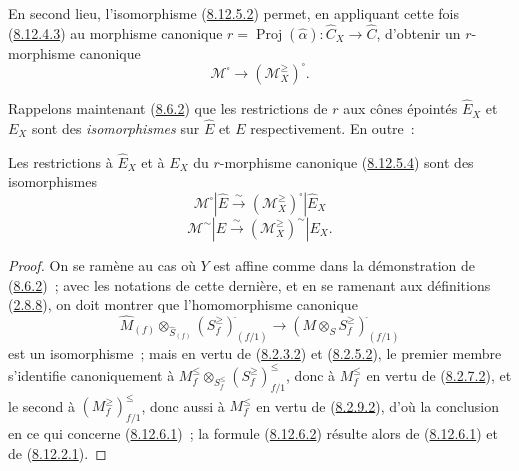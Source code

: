 \begin{env}[8.12.5]
En second lieu, l'isomorphisme (\hyperref[II.8.12.5.2-fr]{8.12.5.2}) permet,
en appliquant cette fois (\hyperref[II.8.12.4.3-fr]{8.12.4.3}) au morphisme
canonique $r=\operatorname{Proj}(\widehat{\alpha}):\widehat{C}_X\to
\widehat{C}$, d'obtenir un $r$-morphisme canonique
\begin{equation}
\label{II.8.12.5.4-fr}
  \mathcal{M}^{\square}\to(\mathcal{M}_X^{\geq})^{\square}.
\tag{8.12.5.4}
\end{equation}

Rappelons maintenant (\hyperref[II.8.6.2-fr]{8.6.2}) que les restrictions de
$r$ aux cônes épointés $\widehat{E}_X$ et $E_X$ sont des \emph{isomorphismes}
sur $\widehat{E}$ et $E$ respectivement. En outre~:
\end{env}

\begin{proposition}[8.12.6]
\label{II.8.12.6-fr}
Les restrictions à $\widehat{E}_X$ et à $E_X$ du $r$-morphisme canonique
\textup{(\hyperref[II.8.12.5.4-fr]{8.12.5.4})} sont des isomorphismes
\begin{equation}
\label{II.8.12.6.1-fr}
  \mathcal{M}^{\square}|\widehat{E}
  \xrightarrow{\sim}(\mathcal{M}_X^{\geq})^{\square}|\widehat{E}_X
\tag{8.12.6.1}
\end{equation}
\begin{equation}
\label{II.8.12.6.2-fr}
  \mathcal{M}^{\sim}|E
  \xrightarrow{\sim}(\mathcal{M}_X^{\geq})^{\sim}|E_X.
\tag{8.12.6.2}
\end{equation}
\end{proposition}

\begin{proof}
On se ramène au cas où $Y$ est affine comme dans la démonstration de
(\hyperref[II.8.6.2-fr]{8.6.2})~; avec les notations de cette dernière, et
en se ramenant aux définitions (\hyperref[II.2.8.8-fr]{2.8.8}), on doit
montrer que l'homomorphisme canonique
\[
  \widehat{M}_{(f)}\otimes_{\widehat{S}_{(f)}}
  (S_f^{\geq})_{(f/1)}^{\widehat{\,}}
  \to(M\otimes_S S_f^{\geq})_{(f/1)}^{\widehat{\,}}
\]
est un isomorphisme~; mais en vertu de
(\hyperref[II.8.2.3.2-fr]{8.2.3.2}) et
(\hyperref[II.8.2.5.2-fr]{8.2.5.2}), le premier membre s'identifie
canoniquement à
$M_f^{\leq}\otimes_{S_f^{\leq}}(S_f^{\geq})_{f/1}^{\leq}$, donc à
$M_f^{\leq}$ en vertu de (\hyperref[II.8.2.7.2-fr]{8.2.7.2}), et le second à
$(M_f^{\geq})_{f/1}^{\leq}$, donc aussi à $M_f^{\leq}$ en vertu de
(\hyperref[II.8.2.9.2-fr]{8.2.9.2}), d'où la conclusion en ce qui concerne
(\hyperref[II.8.12.6.1-fr]{8.12.6.1})~; la formule
(\hyperref[II.8.12.6.2-fr]{8.12.6.2}) résulte alors de
(\hyperref[II.8.12.6.1-fr]{8.12.6.1}) et de
(\hyperref[II.8.12.2.1-fr]{8.12.2.1}).
\end{proof}

